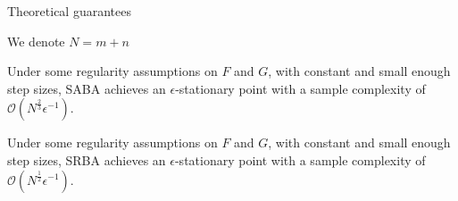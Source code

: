 \documentclass{beamer}
\newcommand{\citeline}[1]{\textcolor{gray}{\small[{\color{linkcolor} #1}]}}
\begin{document}




\begin{frame}{Theoretical guarantees }

    We denote $N = m + n$

    \begin{theorem}
        Under some regularity assumptions on $F$ and $G$, with constant and small enough step sizes, SABA achieves an $\epsilon$-stationary point with a sample complexity of $\mathcal O(N^{\frac23}\epsilon^{-1})$.
    \end{theorem}

    \begin{theorem}
        Under some regularity assumptions on $F$ and $G$, with constant and small enough step sizes, SRBA achieves an $\epsilon$-stationary point with a sample complexity of $\mathcal O(N^{\frac12}\epsilon^{-1})$.
    \end{theorem}


\end{frame}

\end{document}
